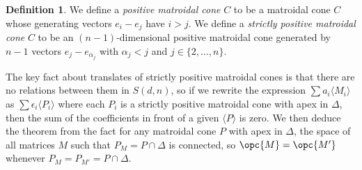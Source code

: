 \documentclass[12pt]{amsart}
\theoremstyle{plain}
\theoremstyle{definition}
\newtheorem{Def}{Definition}[section]
\theoremstyle{remark}
\begin{document}
\begin{Def}
\label{positivematroidalconedef}
We define a \emph{positive matroidal cone} $C$ to be a matroidal cone $C$ whose generating vectors $e_i-e_j$ have $i>j$. We define a \emph{strictly positive matroidal cone} $C$ to be an $(n-1)$-dimensional positive matroidal cone generated by $n-1$ vectors $e_j-e_{\alpha_j}$ with $\alpha_j<j$ and $j \in \{2,\ldots,n\}$.
\end{Def}

The key fact about translates of strictly positive matroidal cones is that there are no relations between them in $S(d,n)$, so if we rewrite the expression $\sum a_i\langle M_i \rangle$ as $\sum \epsilon_i \langle P_i \rangle$ where each $P_i$ is a strictly positive matroidal cone with apex in $\Delta$, then the sum of the coefficients in front of a given $\langle P \rangle$ is zero. We then deduce the theorem from the fact for any matroidal cone $P$ with apex in $\Delta$, the space of all matrices $M$ such that $P_M = P \cap \Delta$ is connected, so $\opc{M} = \opc{M'}$ whenever $P_M = P_{M'} = P \cap \Delta$.
\end{document}
